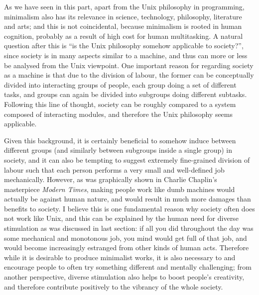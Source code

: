 As we have seen in this part, apart from the Unix philosophy in programming,
minimalism also has its relevance in science, technology, philosophy,
literature and arts; and this is not coincidental, because minimalism is rooted
in human cognition, probably as a result of high cost for human multitasking.
A natural question after this is ``is the Unix philosophy somehow applicable
to society?'', since society is in many aspects similar to a machine, and thus
can more or less be analysed from the Unix viewpoint.  One important reason
for regarding society as a machine is that due to the division of labour,
the former can be conceptually divided into interacting groups of people,
each group doing a set of different tasks, and groups can again be divided
into subgroups doing different subtasks.  Following this line of thought,
society can be roughly compared to a system composed of interacting
modules, and therefore the Unix philosophy seems applicable.

Given this background, it is certainly beneficial to somehow induce
 between different groups
(and similarly between subgroups inside a single group) in society, and it can
also be tempting to suggest extremely fine-grained division of labour such that
each person performs a very small and well-defined job mechanically.  However,
as was graphically shown in Charlie Chaplin's masterpiece \emph{Modern Times},
making people work like dumb machines would actually be against human nature,
and would result in much more damages than benefits to society.  I believe this
is one fundamental reason why society often does not work like Unix, and this
can be explained by the human need for diverse stimulation as was discussed
in last section: if all you did throughout the day was some mechanical and
monotonous job, you mind would get full of that job, and would become
increasingly estranged from other kinds of human acts.  Therefore while it is
desirable to produce minimalist works, it is also necessary to  and encourage people to often try something different and
mentally challenging; from another perspective, diverse stimulation also
helps to boost people's creativity, and therefore contribute
positively to the vibrancy of the whole society.

